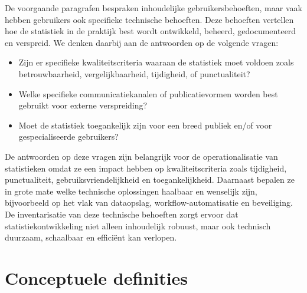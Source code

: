 \documentclass[\mainfiledir/00_handleiding_statistiekproductie.tex]{subfiles}
\begin{document}
De voorgaande paragrafen bespraken inhoudelijke gebruikersbehoeften, maar vaak hebben gebruikers ook specifieke technische behoeften. Deze behoeften vertellen hoe de statistiek in de praktijk best wordt ontwikkeld, beheerd, gedocumenteerd en verspreid. We denken daarbij aan de antwoorden op de volgende vragen:
\begin{itemize}[nosep]
\item Zijn er specifieke kwaliteitscriteria waaraan de statistiek moet voldoen zoals betrouwbaarheid, vergelijkbaarheid, tijdigheid, of punctualiteit?
\item Welke specifieke communicatiekanalen of publicatievormen worden best gebruikt voor externe verspreiding?
\item Moet de statistiek toegankelijk zijn voor een breed publiek en/of voor gespecialiseerde gebruikers?
\end{itemize}
De antwoorden op deze vragen zijn belangrijk voor de operationalisatie van statistieken omdat ze een impact hebben op kwaliteitscriteria zoals tijdigheid, punctualiteit, gebruiksvriendelijkheid en toegankelijkheid. Daarnaast bepalen ze in grote mate welke technische oplossingen haalbaar en wenselijk zijn, bijvoorbeeld op het vlak van dataopslag, workflow-automatisatie en beveiliging. De inventarisatie van deze technische behoeften zorgt ervoor dat statistiekontwikkeling niet alleen inhoudelijk robuust, maar ook technisch duurzaam, schaalbaar en efficiënt kan verlopen.






\section{Conceptuele definities}
\end{document}
